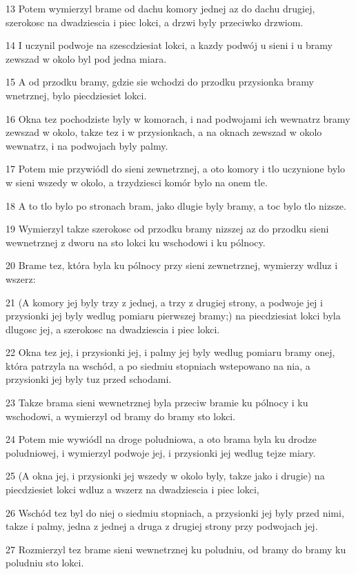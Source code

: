 \par 13 Potem wymierzyl brame od dachu komory jednej az do dachu drugiej, szerokosc na dwadziescia i piec lokci, a drzwi byly przeciwko drzwiom.
\par 14 I uczynil podwoje na szescdziesiat lokci, a kazdy podwój u sieni i u bramy zewszad w okolo byl pod jedna miara.
\par 15 A od przodku bramy, gdzie sie wchodzi do przodku przysionka bramy wnetrznej, bylo piecdziesiet lokci.
\par 16 Okna tez pochodziste byly w komorach, i nad podwojami ich wewnatrz bramy zewszad w okolo, takze tez i w przysionkach, a na oknach zewszad w okolo wewnatrz, i na podwojach byly palmy.
\par 17 Potem mie przywiódl do sieni zewnetrznej, a oto komory i tlo uczynione bylo w sieni wszedy w okolo, a trzydziesci komór bylo na onem tle.
\par 18 A to tlo bylo po stronach bram, jako dlugie byly bramy, a toc bylo tlo nizsze.
\par 19 Wymierzyl takze szerokosc od przodku bramy nizszej az do przodku sieni wewnetrznej z dworu na sto lokci ku wschodowi i ku pólnocy.
\par 20 Brame tez, która byla ku pólnocy przy sieni zewnetrznej, wymierzy wdluz i wszerz:
\par 21 (A komory jej byly trzy z jednej, a trzy z drugiej strony, a podwoje jej i przysionki jej byly wedlug pomiaru pierwszej bramy;) na piecdziesiat lokci byla dlugosc jej, a szerokosc na dwadziescia i piec lokci.
\par 22 Okna tez jej, i przysionki jej, i palmy jej byly wedlug pomiaru bramy onej, która patrzyla na wschód, a po siedmiu stopniach wstepowano na nia, a przysionki jej byly tuz przed schodami.
\par 23 Takze brama sieni wewnetrznej byla przeciw bramie ku pólnocy i ku wschodowi, a wymierzyl od bramy do bramy sto lokci.
\par 24 Potem mie wywiódl na droge poludniowa, a oto brama byla ku drodze poludniowej, i wymierzyl podwoje jej, i przysionki jej wedlug tejze miary.
\par 25 (A okna jej, i przysionki jej wszedy w okolo byly, takze jako i drugie) na piecdziesiet lokci wdluz a wszerz na dwadziescia i piec lokci,
\par 26 Wschód tez byl do niej o siedmiu stopniach, a przysionki jej byly przed nimi, takze i palmy, jedna z jednej a druga z drugiej strony przy podwojach jej.
\par 27 Rozmierzyl tez brame sieni wewnetrznej ku poludniu, od bramy do bramy ku poludniu sto lokci.
